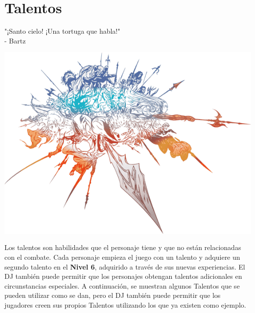 \section*{\hypertarget{talent}{Talentos}}
%
"¡Santo cielo! ¡Una tortuga que habla!" \\
\indent - Bartz
\begin{center} \includegraphics[width=1\columnwidth]{./art/images/ff14.png} \end{center}
%
Los talentos son habilidades que el personaje tiene y que no están relacionadas con el combate. Cada personaje empieza el juego con un talento y adquiere un segundo talento en el \textbf{Nivel 6}, adquirido a través de sus nuevas experiencias. El DJ también puede permitir que los personajes obtengan talentos adicionales en circunstancias especiales. A continuación, se muestran algunos Talentos que se pueden utilizar como se dan, pero el DJ también puede permitir que los jugadores creen sus propios Talentos utilizando los que ya existen como ejemplo. \\

